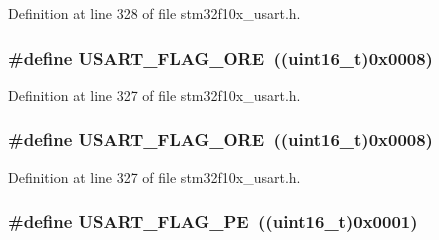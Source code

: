 Definition at line 328 of file stm32f10x\+\_\+usart.\+h.

\subsubsection[{\texorpdfstring{U\+S\+A\+R\+T\+\_\+\+F\+L\+A\+G\+\_\+\+O\+RE}{USART_FLAG_ORE}}]{\setlength{\rightskip}{0pt plus 5cm}\#define U\+S\+A\+R\+T\+\_\+\+F\+L\+A\+G\+\_\+\+O\+RE~(({\bf uint16\+\_\+t})0x0008)}\hypertarget{group___u_s_a_r_t___flags_gabdb285b5c1876d93f9c802f9304538d5}{}\label{group___u_s_a_r_t___flags_gabdb285b5c1876d93f9c802f9304538d5}


Definition at line 327 of file stm32f10x\+\_\+usart.\+h.

\subsubsection[{\texorpdfstring{U\+S\+A\+R\+T\+\_\+\+F\+L\+A\+G\+\_\+\+O\+RE}{USART_FLAG_ORE}}]{\setlength{\rightskip}{0pt plus 5cm}\#define U\+S\+A\+R\+T\+\_\+\+F\+L\+A\+G\+\_\+\+O\+RE~(({\bf uint16\+\_\+t})0x0008)}\hypertarget{group___u_s_a_r_t___flags_gabdb285b5c1876d93f9c802f9304538d5}{}\label{group___u_s_a_r_t___flags_gabdb285b5c1876d93f9c802f9304538d5}


Definition at line 327 of file stm32f10x\+\_\+usart.\+h.

\subsubsection[{\texorpdfstring{U\+S\+A\+R\+T\+\_\+\+F\+L\+A\+G\+\_\+\+PE}{USART_FLAG_PE}}]{\setlength{\rightskip}{0pt plus 5cm}\#define U\+S\+A\+R\+T\+\_\+\+F\+L\+A\+G\+\_\+\+PE~(({\bf uint16\+\_\+t})0x0001)}\hypertarget{group___u_s_a_r_t___flags_ga5e87fde5704f27c75df25395e23404ad}{}\label{group___u_s_a_r_t___flags_ga5e87fde5704f27c75df25395e23404ad}


